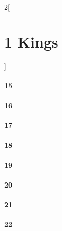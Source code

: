 \documentclass{book}
\begin{document}
\begin{multicols}{2}[\part{1 Kings}]
\subsection*{15}
\subsection*{16}
\subsection*{17}
\subsection*{18}
\subsection*{19}
\subsection*{20}
\subsection*{21}
\subsection*{22}
\end{multicols}
\end{document}
